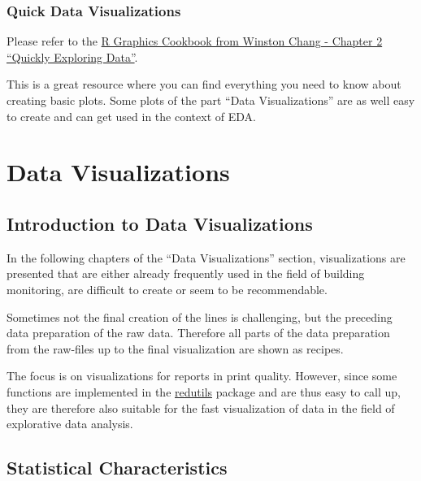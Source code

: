 \documentclass[
  a4paperpaper,
]{book}
\begin{document}
\hypertarget{quick-data-visualizations}{%
\section{Quick Data Visualizations}\label{quick-data-visualizations}}

Please refer to the \href{https://r-graphics.org/chapter-quick}{R Graphics Cookbook from Winston Chang - Chapter 2 ``Quickly Exploring Data''}.

This is a great resource where you can find everything you need to know about creating basic plots.
Some plots of the part ``Data Visualizations'' are as well easy to create and can get used in the context of EDA.

\hypertarget{part-data-visualizations}{%
\part{Data Visualizations}\label{part-data-visualizations}}

\hypertarget{introduction-to-data-visualizations}{%
\chapter{Introduction to Data Visualizations}\label{introduction-to-data-visualizations}}

In the following chapters of the ``Data Visualizations'' section, visualizations are presented that are either already frequently used in the field of building monitoring, are difficult to create or seem to be recommendable.

Sometimes not the final creation of the lines is challenging, but the preceding data preparation of the raw data. Therefore all parts of the data preparation from the raw-files up to the final visualization are shown as recipes.

The focus is on visualizations for reports in print quality. However, since some functions are implemented in the \href{https://github.com/hslu-ige-laes/redutils}{redutils} package and are thus easy to call up, they are therefore also suitable for the fast visualization of data in the field of explorative data analysis.

\hypertarget{statistical-characteristics}{%
\chapter{Statistical Characteristics}\label{statistical-characteristics}}
\end{document}
